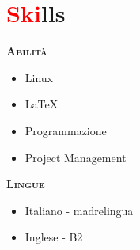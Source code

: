 \section*{\textcolor{red}{Ski}lls}
\begin{multicols}{2}
    \large{\textbf{\textsc{Abilità}}}
    \begin{itemize}
        \item Linux
        \item \LaTeX
        \item Programmazione
        \item Project Management
    \end{itemize}
    \vfill\null\columnbreak
    \large{\textbf{\textsc{Lingue}}}
    \begin{itemize}
        \item Italiano - madrelingua
        \item Inglese - B2
    \end{itemize}
\end{multicols}